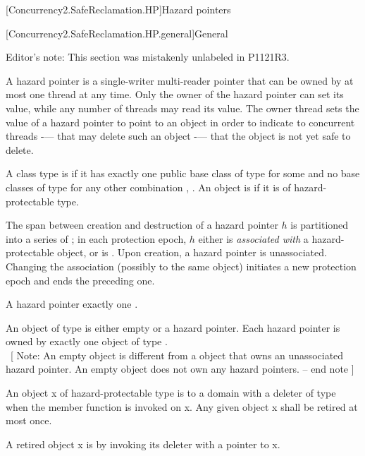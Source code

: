 
[Concurrency2.SafeReclamation.HP]{Hazard pointers}

[Concurrency2.SafeReclamation.HP.general]{General}

Editor's note: This section was mistakenly unlabeled in P1121R3.

\pnum
A hazard pointer is a single-writer multi-reader pointer that can be owned by at most one thread at any time. Only the owner of the hazard pointer can set its value, while any number of threads may read its value. The owner thread sets the value of a hazard pointer to point to an object in order to indicate to concurrent threads -— that may delete such an object -— that the object is not yet safe to delete.

\pnum
A class type  is  if it has exactly one public base class of type  for some  and no base classes of type  for any other combination , . An object is  if it is of hazard-protectable type.

\pnum
The span between creation and destruction of a hazard pointer $h$ is partitioned into a series of ; in each protection epoch, $h$ either is {\em associated with} a hazard-protectable object, or is . Upon creation, a hazard pointer is unassociated. Changing the association (possibly to the same object) initiates a new protection epoch and ends the preceding one.

\pnum
A hazard pointer  exactly one . 

\pnum
An object of type  is either empty or  a hazard pointer. Each hazard pointer is owned by exactly one object of type .\\\
[ Note: An empty  object is different from a  object that
owns an unassociated hazard pointer. An empty \tcode{hazard_pointer} object does not own any hazard pointers. -- end note ]

\pnum
An object x of hazard-protectable type  is  to a domain with a deleter of type  when the member function  is invoked on x. Any given object x shall be retired at most once.

\pnum
A retired object x is  by invoking its deleter with a pointer to x.


